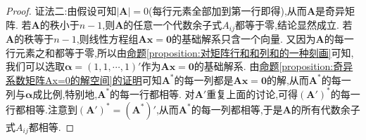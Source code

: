 \documentclass[../../main.tex]{subfiles}%
\begin{document}
\begin{proof}
{\color{blue}证法二:}由假设可知$\left| \boldsymbol{A} \right|=0$(每行元素全部加到第一行即得),从而\(\boldsymbol{A}\)是奇异矩阵. 若\(\boldsymbol{A}\)的秩小于\(n - 1\),则\(\boldsymbol{A}\)的任意一个代数余子式\(A_{ij}\)都等于零,结论显然成立. 若\(\boldsymbol{A}\)的秩等于\(n - 1\),则线性方程组\(\boldsymbol{A}\boldsymbol{x}=\boldsymbol{0}\)的基础解系只含一个向量. 又因为\(\boldsymbol{A}\)的每一行元素之和都等于零,所以由\hyperref[proposition:对矩阵行和和列和的一种刻画]{命题\ref{proposition:对矩阵行和和列和的一种刻画}}可知,我们可以选取\(\boldsymbol{\alpha}=(1,1,\cdots,1)'\)作为\(\boldsymbol{A}\boldsymbol{x}=\boldsymbol{0}\)的基础解系. 由\hyperref[proposition:奇异系数矩阵Ax=0的解空间]{命题\ref{proposition:奇异系数矩阵Ax=0的解空间}的证明}可知\(\boldsymbol{A}^*\)的每一列都是$\boldsymbol{A}\boldsymbol{x}=\boldsymbol{0}$的解,从而\(\boldsymbol{A}^*\)的每一列与\(\boldsymbol{\alpha}\)成比例,特别地,\(\boldsymbol{A}^*\)的每一行都相等. 对\(\boldsymbol{A}'\)重复上面的讨论,可得\((\boldsymbol{A}')^*\)的每一行都相等.注意到\((\boldsymbol{A}')^*=(\boldsymbol{A}^*)'\),从而\(\boldsymbol{A}^*\)的每一列都相等,于是\(\boldsymbol{A}\)的所有代数余子式\(A_{ij}\)都相等.

\end{proof}
\end{document}
